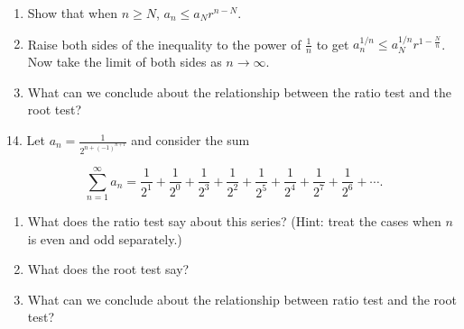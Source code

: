 \documentclass{article}
\begin{document}
\begin{enumerate}

	\item Show that when $n \geq N$, $a_n \leq a_N r^{n - N}$.

	\item Raise both sides of the inequality to the power of $\frac{1}{n}$ to get $a_n^{1/n} \leq a_N^{1/n} r^{1 - \frac{N}{n}}$. Now take the limit of both sides as $n \to \infty$.

	\item What can we conclude about the relationship between the ratio test and the root test?

\end{enumerate}

14. Let $\displaystyle a_n = \frac{1}{2^{n + (-1)^{n + 1}}}$ and consider the sum

$$
	\sum_{n = 1}^\infty a_n = \frac{1}{2^1} + \frac{1}{2^0} + \frac{1}{2^3} + \frac{1}{2^2} + \frac{1}{2^5} + \frac{1}{2^4} + \frac{1}{2^7} + \frac{1}{2^6} + \cdots.
$$

\begin{enumerate}

	\item What does the ratio test say about this series? (Hint: treat the cases when $n$ is even and odd separately.)

	\item What does the root test say?

	\item What can we conclude about the relationship between ratio test and the root test?

\end{enumerate}
\end{document}
